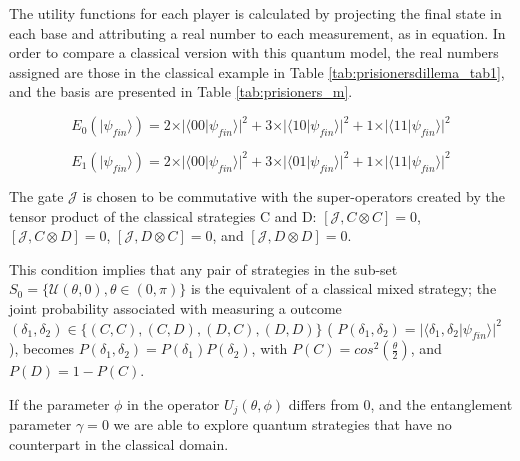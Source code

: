 The utility functions for each player is calculated by projecting the final state in each base and attributing a real number to each measurement, as in equation.
In order to compare a classical version with this quantum model, the real numbers assigned are those in the classical example in Table \ref{tab:prisionersdillema_tab1}, and the basis are presented in Table \ref{tab:prisioners_m}.

\begin{equation}
E_{0}(\vert\psi_{fin}\rangle)=2\times\vert\langle00\vert\psi_{fin}\rangle\vert^{2}+3\times\vert\langle10\vert\psi_{fin}\rangle\vert^{2}+1\times\vert\langle11\vert\psi_{fin}\rangle\vert^{2}
\end{equation}


\begin{equation}
E_{1}(\vert\psi_{fin}\rangle)=2\times\vert\langle00\vert\psi_{fin}\rangle\vert^{2}+3\times\vert\langle01\vert\psi_{fin}\rangle\vert^{2}+1\times\vert\langle11\vert\psi_{fin}\rangle\vert^{2}
\end{equation}



The gate $\mathcal{J}$ is chosen to be commutative with the super-operators created by the tensor product of the classical strategies C and D: $ [ \mathcal{J} , C \otimes C ] = 0 $, $ [ \mathcal{J} , C \otimes D ] = 0 $, $ [ \mathcal{J} , D \otimes C ] = 0 $, and $ [ \mathcal{J} , D \otimes D ] = 0 $. 

This condition implies that any pair of strategies in the sub-set $S_{0} = \{ \mathcal{U} ( \theta , 0) , \theta \in (0, \pi) \}$ is the equivalent of a classical mixed strategy; the joint probability associated with measuring a outcome $(\delta_{1}, \delta_{2}) \in \{ (C, C), (C, D), (D, C), (D, D) \} $ ( $ P( \delta_{1} , \delta_{2} ) = { \vert \langle \delta_{1} , \delta_{2} \vert \psi_{fin} \rangle \vert }^{2} $ ), becomes $ P( \delta_{1} , \delta_{2} ) =P( \delta_{1} ) P( \delta_{2})$, with $P(C) = cos^{2}(\frac{ \theta }{2})$, and $P(D) = 1 - P(C)$\cite{Eisert2008}.

If the parameter $\phi$ in the operator $U_{j}(\theta ,\phi)$ differs from $0$, and the entanglement parameter $\gamma = 0$ we are able to explore quantum strategies that have no counterpart in the classical domain.




